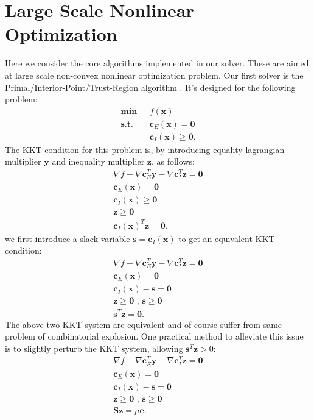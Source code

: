 \documentclass[annual]{acmsiggraph}
\newcommand{\E}[1]{\mathbf{#1}}
\begin{document}
\section{Large Scale Nonlinear Optimization}
Here we consider the core algorithms implemented in our solver. These are aimed at large scale non-convex nonlinear optimization problem. Our first solver is the Primal/Interior-Point/Trust-Region algorithm \cite{nocedalnumerical}. It's designed for the following problem:
\begin{subequations}
\label{pb:ORIGIN}
\begin{align}
\E{min}\text{ }&f(\E{x})	\\
\E{s.t.}\text{ }&\E{c}_E(\E{x})=\E{0}	\\
\text{ }&\E{c}_I(\E{x}) \geq \E{0}.
\end{align}
\end{subequations}
The KKT condition for this problem is, by introducing equality lagrangian multiplier $\E{y}$ and inequality multiplier $\E{z}$, as follows:
\begin{eqnarray*}
\nabla f-\nabla\E{c}_E^T\E{y}-\nabla\E{c}_I^T\E{z}=\E{0}	\\
\E{c}_E(\E{x})=\E{0}	\\
\E{c}_I(\E{x}) \geq \E{0}	\\
\E{z} \geq \E{0}	\\
\E{c}_I(\E{x})^T\E{z}=\E{0},
\end{eqnarray*}
we first introduce a slack variable $\E{s}=\E{c}_I(\E{x})$ to get an equivalent KKT condition:
\begin{eqnarray*}
\nabla f-\nabla\E{c}_E^T\E{y}-\nabla\E{c}_I^T\E{z}=\E{0}	\\
\E{c}_E(\E{x})=\E{0}	\\
\E{c}_I(\E{x})-\E{s}=\E{0}	\\
\E{z} \geq \E{0} \text{ , } \E{s} \geq \E{0}	\\
\E{s}^T\E{z}=\E{0}.
\end{eqnarray*}
The above two KKT system are equivalent and of course suffer from same problem of combinatorial explosion. One practical method to alleviate this issue is to slightly perturb the KKT system, allowing $\E{s}^T\E{z} > 0$:
\begin{eqnarray*}
\nabla f-\nabla\E{c}_E^T\E{y}-\nabla\E{c}_I^T\E{z}=\E{0}	\\
\E{c}_E(\E{x})=\E{0}	\\
\E{c}_I(\E{x})-\E{s}=\E{0}	\\
\E{z} \geq \E{0} \text{ , } \E{s} \geq \E{0}	\\
\E{S} \E{z}=\mu \E{e}.
\end{eqnarray*}
\end{document}
